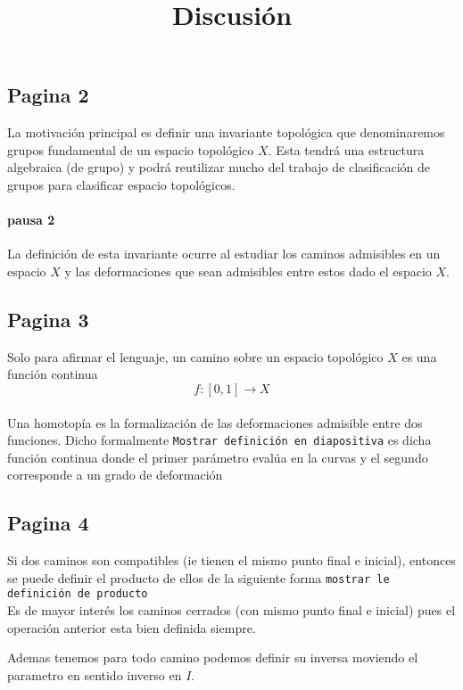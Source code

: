 \documentclass[letterpaper]{article}
\begin{document}
\title{Discusión}

\subsection*{Pagina 2}
La motivación principal es definir una invariante topológica que
denominaremos grupos fundamental de un espacio topológico \(X\). Esta
tendrá una estructura algebraica (de grupo) y podrá reutilizar mucho del
trabajo de clasificación de grupos para clasificar espacio topológicos.

\paragraph{pausa 2}
La definición de esta invariante ocurre al estudiar los caminos
admisibles en un espacio \(X\) y las deformaciones que sean admisibles
entre estos dado el espacio \(X\).

\subsection*{Pagina 3}
Solo para afirmar el lenguaje, un camino sobre un espacio topológico
\(X\) es una función continua
\[ f : [0,1] \to X \]

\paragraph{}
Una homotopía es la formalización de las deformaciones admisible entre
dos funciones. Dicho formalmente \texttt{Mostrar definición en
  diapositiva} es dicha función continua donde el primer parámetro
evalúa en la curvas y el segundo corresponde a un grado de deformación

\subsection*{Pagina 4}
Si dos caminos son compatibles (ie tienen el mismo punto final e
inicial), entonces se puede definir el producto de ellos de la siguiente
forma \texttt{mostrar le definición de producto} \\

Es de mayor interés los caminos cerrados (con mismo punto final e
inicial) pues el operación anterior esta bien definida siempre.

Ademas tenemos para todo camino podemos definir su inversa moviendo el
parametro en sentido inverso en \(I\).
\end{document}
